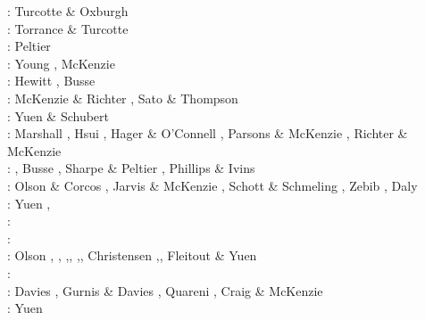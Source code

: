 \begin{scriptsize}
\nineteensixtyseven: Turcotte \& Oxburgh \cite{tuox67}\\
\nineteenseventyone: Torrance \& Turcotte \cite{totu71}\\
\nineteenseventytwo: Peltier \cite{pelt72}\\
\nineteenseventyfour: Young \cite{youn74}, McKenzie \etal \cite{mcrw74}\\
\nineteenseventyfive: Hewitt \etal \cite{hemw75}, Busse \cite{buss75}\\
\nineteenseventysix: McKenzie \& Richter \cite{mcri76}, Sato \& Thompson \cite{sath76}\\
\nineteenseventyseven: Yuen \& Schubert \cite{yusc77} \\
\nineteenseventyeight: Marshall \etal \cite{mahz78}, Hsui \cite{hsui78}, Hager \& O'Connell \cite{haoc78},
                       Parsons \& McKenzie \cite{pamc78}, Richter \& McKenzie \cite{rimc78}\\
\nineteenseventynine: \cite{ludt79}, Busse \cite{buss79}, Sharpe \& Peltier \cite{shpe79},
                      Phillips \& Ivins \cite{phiv79}\\
\nineteeneighty: Olson \& Corcos \cite{olco80}, Jarvis \& McKenzie \cite{jamc80},
                 Schott \& Schmeling \cite{scsc80}, Zebib \etal \cite{zess80},
                 Daly \cite{daly80} \\
\nineteeneightyone: Yuen \etal \cite{yups81}, \cite{buss81}\cite{jasc81}\cite{haoc81}\cite{cotu81}\\
\nineteeneightytwo: \cite{jape82}\cite{homc82}\cite{buri82}\\
\nineteeneightythree: \cite{hous83}\cite{hous83b}
                      \cite{chri83}\cite{mcke83}
                      \cite{chri83b}\cite{zesd83}\\
\nineteeneightyfour: Olson \etal \cite{olyb84}, \cite{jarv84},
                     \cite{haeb84},\cite{harp84},
                     \cite{davi84},\cite{boas84},
                     Christensen \cite{chri84,chri84b},\cite{moca84},
                     Fleitout \& Yuen \cite{flyu84,flyu84b}\\
\nineteeneightyfive: \cite{jarv85}\cite{baum85}\cite{chri85}\cite{csra85}\cite{scan85}\\
\nineteeneightysix: Davies \cite{davi86}, Gurnis \& Davies \cite{guda86},
                    Quareni \etal \cite{quys86}, Craig \& McKenzie \cite{crmc86}\\
\nineteeneightyseven: Yuen \etal{}\cite{yuqh87}\\

\end{scriptsize}
